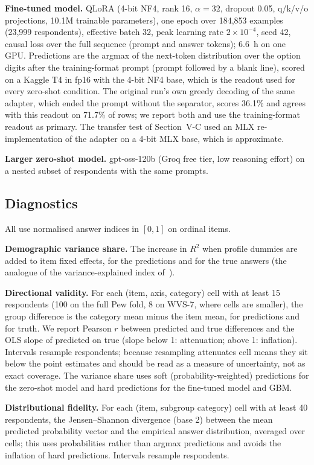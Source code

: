 \documentclass[conference]{IEEEtran}
\begin{document}
\textbf{Fine-tuned model.} QLoRA \cite{dettmers2023,hu2022} (4-bit NF4, rank 16, $\alpha{=}32$, dropout 0.05, q/k/v/o projections, 10.1M trainable parameters), one epoch over 184{,}853 examples (23{,}999 respondents), effective batch 32, peak learning rate $2\times10^{-4}$, seed 42, causal loss over the full sequence (prompt and answer tokens); 6.6~h on one GPU. Predictions are the argmax of the next-token distribution over the option digits after the training-format prompt (prompt followed by a blank line), scored on a Kaggle T4 in fp16 with the 4-bit NF4 base, which is the readout used for every zero-shot condition. The original run's own greedy decoding of the same adapter, which ended the prompt without the separator, scores 36.1\% and agrees with this readout on 71.7\% of rows; we report both and use the training-format readout as primary. The transfer test of Section~V-C used an MLX re-implementation of the adapter on a 4-bit MLX base, which is approximate.

\textbf{Larger zero-shot model.} gpt-oss-120b \cite{gptoss2025} (Groq free tier, low reasoning effort) on a nested subset of respondents with the same prompts.

\subsection{Diagnostics}

All use normalised answer indices in $[0,1]$ on ordinal items.

\textbf{Demographic variance share.} The increase in $R^2$ when profile dummies are added to item fixed effects, for the predictions and for the true answers (the analogue of the variance-explained index of~\cite{chen2026}).

\textbf{Directional validity.} For each (item, axis, category) cell with at least 15 respondents (100 on the full Pew fold, 8 on WVS-7, where cells are smaller), the group difference is the category mean minus the item mean, for predictions and for truth. We report Pearson $r$ between predicted and true differences and the OLS slope of predicted on true (slope below 1: attenuation; above 1: inflation). Intervals resample respondents; because resampling attenuates cell means they sit below the point estimates and should be read as a measure of uncertainty, not as exact coverage. The variance share uses soft (probability-weighted) predictions for the zero-shot model and hard predictions for the fine-tuned model and GBM.

\textbf{Distributional fidelity.} For each (item, subgroup category) cell with at least 40 respondents, the Jensen--Shannon divergence (base 2) between the mean predicted probability vector and the empirical answer distribution, averaged over cells; this uses probabilities rather than argmax predictions and avoids the inflation of hard predictions. Intervals resample respondents.
\end{document}
